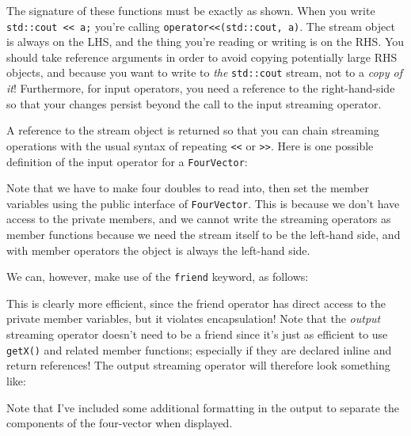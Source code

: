 \documentclass[a4paper]{scrartcl}
\begin{document}
The signature of these functions must be exactly as shown. When you write \newline \verb|std::cout << a;| you're calling \verb|operator<<(std::cout, a)|. The stream object is always on the LHS, and the thing you're reading or writing is on the RHS. You should take reference arguments in order to avoid copying potentially large RHS objects, and because you want to write to \emph{the} \verb|std::cout| stream, not to a \emph{copy of it}! Furthermore, for input operators, you need a reference to the right-hand-side so that your changes persist beyond the call to the input streaming operator.

A reference to the stream object is returned so that you can chain streaming operations with the usual syntax of repeating \verb|<<| or \verb|>>|. Here is one possible definition of the input operator for a \verb|FourVector|:



Note that we have to make four doubles to read into, then set the member variables using the public interface of \verb|FourVector|. This is because we don't have access to the private members, and we cannot write the streaming operators as member functions because we need the stream itself to be the left-hand side, and with member operators the object is always the left-hand side.

We can, however, make use of the \verb|friend| keyword, as follows:



This is clearly more efficient, since the friend operator has direct access to the private member variables, but it violates encapsulation! Note that the \emph{output} streaming operator doesn't need to be a friend since it's just as efficient to use \verb|getX()| and related member functions; especially if they are declared inline and return references! The output streaming operator will therefore look something like:



Note that I've included some additional formatting in the output to separate the components of the four-vector when displayed.


\end{document}
